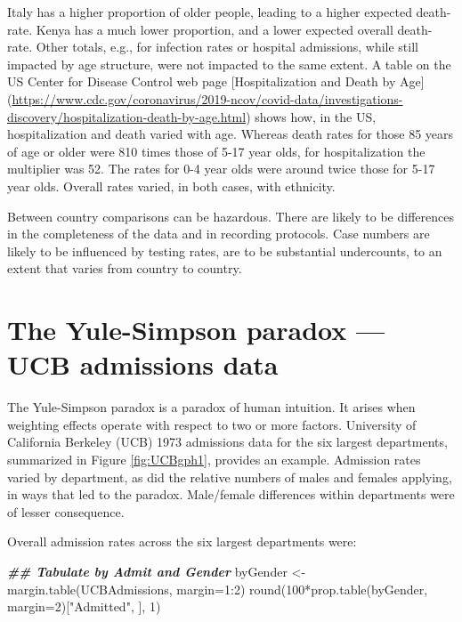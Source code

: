 \documentclass[
  10pt,
  b5paper]{book}
\newenvironment{Shaded}{\begin{snugshade}}{\end{snugshade}}
\newcommand{\AttributeTok}[1]{\textcolor[rgb]{0.77,0.63,0.00}{#1}}
\newcommand{\DecValTok}[1]{\textcolor[rgb]{0.00,0.00,0.81}{#1}}
\newcommand{\DocumentationTok}[1]{\textcolor[rgb]{0.56,0.35,0.01}{\textbf{\textit{#1}}}}
\newcommand{\FunctionTok}[1]{\textcolor[rgb]{0.00,0.00,0.00}{#1}}
\newcommand{\NormalTok}[1]{#1}
\newcommand{\OtherTok}[1]{\textcolor[rgb]{0.56,0.35,0.01}{#1}}
\newcommand{\SpecialCharTok}[1]{\textcolor[rgb]{0.00,0.00,0.00}{#1}}
\newcommand{\StringTok}[1]{\textcolor[rgb]{0.31,0.60,0.02}{#1}}
\begin{document}
Italy has a higher proportion of older people, leading to a higher
expected death-rate. Kenya has a much lower proportion, and a lower
expected overall death-rate. Other totals, e.g., for infection rates
or hospital admissions, while still impacted by age structure, were not
impacted to the same extent. A table on the US Center for Disease
Control web page {[}Hospitalization and Death by Age{]} (\url{https://www.cdc.gov/coronavirus/2019-ncov/covid-data/investigations-discovery/hospitalization-death-by-age.html})
shows how, in the US, hospitalization and death varied with
age. Whereas death rates for those 85 years of age or older were
810 times those of 5-17 year olds, for hospitalization the multiplier
was 52. The rates for 0-4 year olds were around twice those for
5-17 year olds. Overall rates varied, in both cases, with ethnicity.

Between country comparisons can be hazardous. There are likely to be
differences in the completeness of the data and in recording protocols.
Case numbers are likely to be influenced by testing rates, are to be
substantial undercounts, to an extent that varies from country to country.

\hypertarget{the-yule-simpson-paradox-ucb-admissions-data}{%
\section{The Yule-Simpson paradox --- UCB admissions data}\label{the-yule-simpson-paradox-ucb-admissions-data}}

The Yule-Simpson paradox is a paradox of human intuition.
It arises when weighting effects operate with respect to two
or more factors. University of California Berkeley (UCB)
1973 admissions data for the six largest departments,
summarized in Figure \ref{fig:UCBgph1}, provides an example.
Admission rates varied by department, as did the relative
numbers of males and females applying, in ways that led to the
paradox. Male/female differences within departments were of
lesser consequence.

Overall admission rates across the six largest departments were:

\begin{Shaded}
\begin{Highlighting}[]
\DocumentationTok{\#\# Tabulate by Admit and Gender}
\NormalTok{byGender }\OtherTok{\textless{}{-}} \FunctionTok{margin.table}\NormalTok{(UCBAdmissions, }\AttributeTok{margin=}\DecValTok{1}\SpecialCharTok{:}\DecValTok{2}\NormalTok{)}
\FunctionTok{round}\NormalTok{(}\DecValTok{100}\SpecialCharTok{*}\FunctionTok{prop.table}\NormalTok{(byGender, }\AttributeTok{margin=}\DecValTok{2}\NormalTok{)[}\StringTok{"Admitted"}\NormalTok{, ], }\DecValTok{1}\NormalTok{)}
\end{Highlighting}
\end{Shaded}
\end{document}
